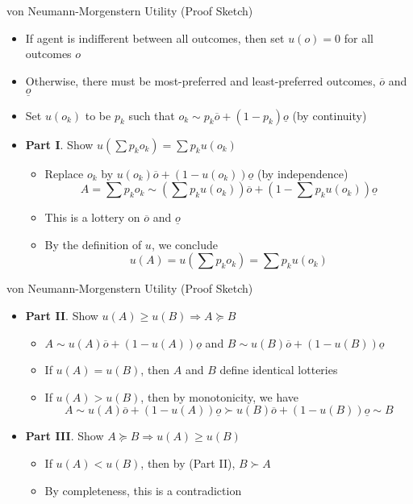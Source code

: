 \documentclass[11pt,aspectratio=169,handout]{beamer}
\begin{document}
  \begin{frame}{von Neumann-Morgenstern Utility (Proof Sketch)}
   \begin{itemize}[<+->]
    \item If agent is indifferent between all outcomes, then set $u(o) = 0$ for all outcomes $o$
    \item Otherwise, there must be most-preferred and least-preferred outcomes, $\overline{o}$ and $\underline{o}$
    \item Set $u(o_k)$ to be $p_k$ such that $o_k \sim p_k\overline{o}+(1-p_k)\underline{o}$ (by \alert{continuity})
    \item \textbf{Part I}. Show $u(\sum p_k o_k) = \sum p_k u(o_k)$
    \begin{itemize}[<.(1)->]
     \item Replace $o_k$ by $u(o_k)\overline{o}+(1-u(o_k))\underline{o}$ (by \alert{independence})
      $$A = \sum p_k o_k \sim \left(\sum p_k u(o_k)\right) \overline{o} + \left(1-\sum p_k u(o_k)\right)\underline{o}$$
     \item This is a lottery on $\overline{o}$ and $\underline{o}$
     \item By the definition of $u$, we conclude
       $$u(A) = u\left(\sum p_k o_k\right) = \sum p_k u(o_k)$$ 
    \end{itemize}
   \end{itemize}
  \end{frame}
  
  \begin{frame}{von Neumann-Morgenstern Utility (Proof Sketch)}
   \begin{itemize}[<+->]
    \item \textbf{Part II}. Show $u(A) \ge u(B) \Longrightarrow A \succeq B$
    \begin{itemize}[<.(1)->]
     \item $A \sim u(A)\overline{o} + (1-u(A))\underline{o}$ and $B \sim u(B)\overline{o} + (1-u(B))\underline{o}$
     \item If $u(A) = u(B)$, then $A$ and $B$ define identical lotteries
     \item If $u(A) > u(B)$, then by \alert{monotonicity}, we have $$A \sim u(A)\overline{o} + (1-u(A))\underline{o} \succ u(B)\overline{o} + (1-u(B))\underline{o} \sim B$$
    \end{itemize}
    \item \textbf{Part III}. Show $A \succeq B \Longrightarrow u(A) \ge u(B)$
    \begin{itemize}[<.(1)->]
     \item If $u(A) < u(B)$, then by (Part II), $B \succ A$
     \item By \alert{completeness}, this is a contradiction
    \end{itemize}
   \end{itemize}
  \end{frame}
  
\end{document}
